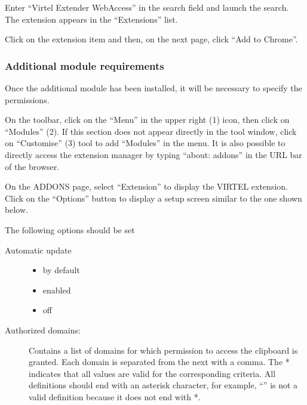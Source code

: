 \documentclass[letterpaper,10pt,english]{sphinxmanual}
\begin{document}

Enter “Virtel Extender WebAccess” in the search field and launch the search. The extension appears in the “Extensions” list.


Click on the extension item and then, on the next page, click “Add to Chrome”.


\subsubsection{Additional module requirements}
\label{\detokenize{User_Guide:id6}}
Once the additional module has been installed, it will be necessary to specify the permissions.


On the toolbar, click on the “Menu” in the upper right (1) icon, then click on “Modules” (2). If this section does not
appear directly in the tool window, click on “Customise” (3) tool to add “Modules” in the menu. It is also possible to
directly access the extension manager by typing “about: addons” in the URL bar of the browser.


On the ADDONS page, select “Extension” to display the VIRTEL extension. Click on the “Options” button to display a
setup screen similar to the one shown below.



The following options should be set
\begin{description}
\item[{Automatic update}] \leavevmode\begin{itemize}
\item {} 
by default

\item {} 
enabled

\item {} 
off

\end{itemize}

\item[{Authorized domains:}] \leavevmode
Contains a list of domains for which permission to access the clipboard is granted. Each domain is separated from the next with a comma. The * indicates that all values are valid for the corresponding criteria. All definitions should end with an asterisk character, for example, “” is not a valid definition because it does not end with *.

\end{description}
\end{document}
